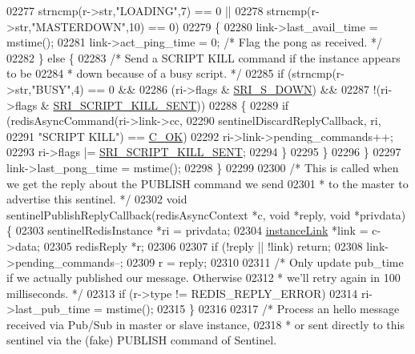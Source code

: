 \begin{DoxyCode}
{{{{{{{{{{{{{{{{{{{{{{{{{{{{{{{{{{{{{{{{{{{{{{{{02277             strncmp(r->str,\textcolor{stringliteral}{"LOADING"},7) == 0 ||
02278             strncmp(r->str,\textcolor{stringliteral}{"MASTERDOWN"},10) == 0)
02279         \{
02280             link->last\_avail\_time = mstime();
02281             link->act\_ping\_time = 0; \textcolor{comment}{/* Flag the pong as received. */}
02282         \} \textcolor{keywordflow}{else} \{
02283             \textcolor{comment}{/* Send a SCRIPT KILL command if the instance appears to be}
02284 \textcolor{comment}{             * down because of a busy script. */}
02285             \textcolor{keywordflow}{if} (strncmp(r->str,\textcolor{stringliteral}{"BUSY"},4) == 0 &&
02286                 (ri->flags & \hyperlink{sentinel_8c_a8e26596c8bde451c2dd9cecb2c3046d4}{SRI\_S\_DOWN}) &&
02287                 !(ri->flags & \hyperlink{sentinel_8c_a8deaaf376eb76dcf5ab4ca652df3a52b}{SRI\_SCRIPT\_KILL\_SENT}))
02288             \{
02289                 \textcolor{keywordflow}{if} (redisAsyncCommand(ri->link->cc,
02290                         sentinelDiscardReplyCallback, ri,
02291                         \textcolor{stringliteral}{"SCRIPT KILL"}) == \hyperlink{server_8h_a303769ef1065076e68731584e758d3e1}{C\_OK})
02292                     ri->link->pending\_commands++;
02293                 ri->flags |= \hyperlink{sentinel_8c_a8deaaf376eb76dcf5ab4ca652df3a52b}{SRI\_SCRIPT\_KILL\_SENT};
02294             \}
02295         \}
02296     \}
02297     link->last\_pong\_time = mstime();
02298 \}
02299 
02300 \textcolor{comment}{/* This is called when we get the reply about the PUBLISH command we send}
02301 \textcolor{comment}{ * to the master to advertise this sentinel. */}
02302 \textcolor{keywordtype}{void} sentinelPublishReplyCallback(redisAsyncContext *c, \textcolor{keywordtype}{void} *reply, \textcolor{keywordtype}{void} *privdata) \{
02303     sentinelRedisInstance *ri = privdata;
02304     \hyperlink{structinstanceLink}{instanceLink} *link = c->data;
02305     redisReply *r;
02306 
02307     \textcolor{keywordflow}{if} (!reply || !link) \textcolor{keywordflow}{return};
02308     link->pending\_commands--;
02309     r = reply;
02310 
02311     \textcolor{comment}{/* Only update pub\_time if we actually published our message. Otherwise}
02312 \textcolor{comment}{     * we'll retry again in 100 milliseconds. */}
02313     \textcolor{keywordflow}{if} (r->type != REDIS\_REPLY\_ERROR)
02314         ri->last\_pub\_time = mstime();
02315 \}
02316 
02317 \textcolor{comment}{/* Process an hello message received via Pub/Sub in master or slave instance,}
02318 \textcolor{comment}{ * or sent directly to this sentinel via the (fake) PUBLISH command of Sentinel.}
}}}}}}}}}}}}}}}}}}}}}}}}}}}}}}}}}}}}}}}}}}}}}}}}
\end{DoxyCode}

